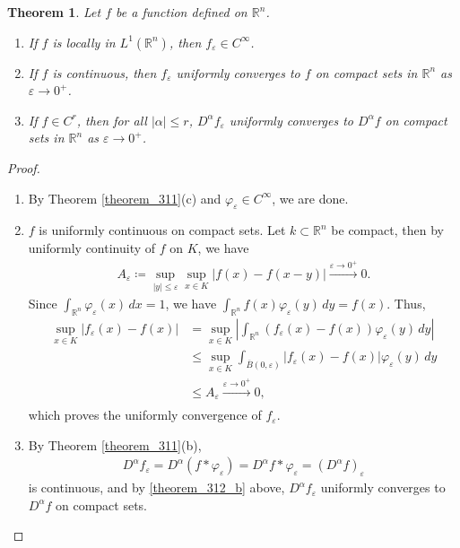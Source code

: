 \documentclass[11pt]{book}
\newtheorem{theorem}{Theorem}[chapter]
\theoremstyle{definition}
\numberwithin{equation}{chapter}
\begin{document}
\begin{theorem}\label{theorem_312}
Let $f$ be a function defined on $\mathbb{R}^n$.
\begin{enumerate}[label=(\alph*)]
    \item If $f$ is locally in $L^1(\mathbb{R}^n)$, then $f_{\varepsilon} \in C^\infty$.\label{theorem_312_a}
    
    \item If $f$ is continuous, then $f_{\varepsilon}$ uniformly converges to $f$ on compact sets in $\mathbb{R}^n$ as $\varepsilon \to 0^{+}$.
    
    \item If $f \in C^r$, then for all $\left|\alpha\right| \leq r$, $D^\alpha f_{\varepsilon}$ uniformly converges to $D^{\alpha} f$ on compact sets in $\mathbb{R}^n$ as $\varepsilon \to 0^{+}$.
\end{enumerate}
\end{theorem}
\begin{proof}
~\begin{enumerate}[label=(\alph*)]
    \item By Theorem \ref{theorem_311}(c) and $\varphi_{\varepsilon} \in C^\infty$, we are done.
    
    \item $f$ is uniformly continuous on compact sets. Let $k \subset \mathbb{R}^n$ be compact, then by uniformly continuity of $f$ on $K$, we have
    \begin{align*}
        A_{\varepsilon} \coloneqq \sup_{\left|y\right|\leq\varepsilon} \sup_{x\in K} \left|f(x) - f(x - y)\right| \xrightarrow[]{\varepsilon\to 0^{+}} 0.
    \end{align*}
    Since $\int_{\mathbb{R}^n}\varphi_{\varepsilon}(x)\,dx = 1$, we have $\int_{\mathbb{R}^n}f(x)\varphi_{\varepsilon}(y)\,dy = f(x)$. Thus,
    \begin{align*}
        \sup_{x\in K} \left|f_{\varepsilon}(x) - f(x)\right| & = \sup_{x\in K} \left|\int_{\mathbb{R}^n} (f_{\varepsilon}(x) - f(x)) \varphi_{\varepsilon}(y) \,dy\right| \\
        & \leq \sup_{x\in K} \int_{\overline{B}(0,\varepsilon)} \left|f_{\varepsilon}(x) - f(x)\right| \varphi_{\varepsilon}(y) \,dy \\
        & \leq A_{\varepsilon} \xrightarrow[]{\varepsilon\to 0^{+}} 0,
    \end{align*}
    which proves the uniformly convergence of $f_{\varepsilon}$.\label{theorem_312_b}
    
    \item By Theorem \ref{theorem_311}(b),
    \begin{align*}
        D^\alpha f_{\varepsilon} = D^\alpha (f*\varphi_{\varepsilon}) = D^\alpha f*\varphi_{\varepsilon} = \left(D^\alpha f\right)_{\varepsilon}
    \end{align*}
    is continuous, and by \ref{theorem_312_b} above, $D^\alpha f_{\varepsilon}$ uniformly converges to $D^\alpha f$ on compact sets.
\end{enumerate}
\end{proof}
\end{document}
